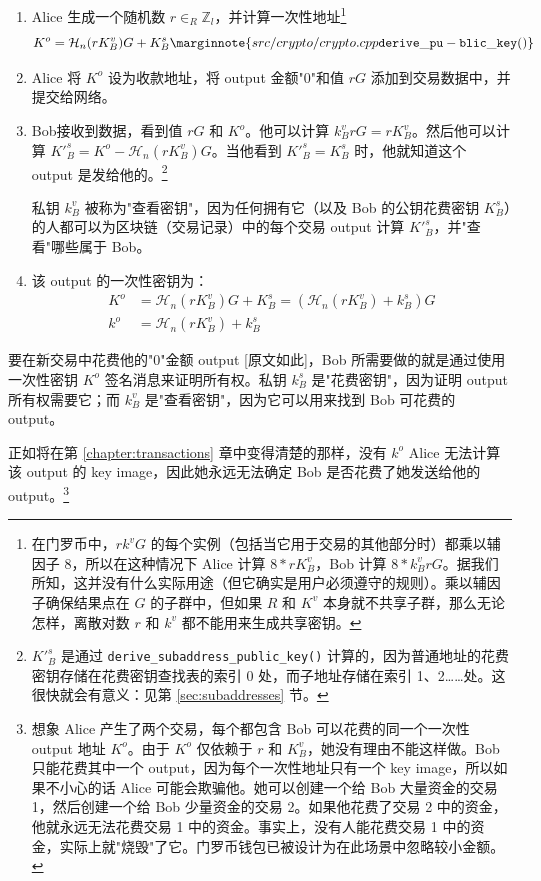 \begin{enumerate}
	\item Alice 生成一个随机数 $r \in_R \mathbb{Z}_l$，并计算一次性地址\footnote{在门罗币中，$r k^v G$ 的每个实例（包括当它用于交易的其他部分时）都乘以辅因子 8，所以在这种情况下 Alice 计算 $8*r K^v_B$，Bob 计算 $8*k^v_B r G$。据我们所知，这并没有什么实际用途（但它{确实}是用户必须遵守的规则）。乘以辅因子确保结果点在 $G$ 的子群中，但如果 $R$ 和 $K^v$ 本身就不共享子群，那么无论怎样，离散对数 $r$ 和 $k^v$ 都不能用来生成共享密钥。}\vspace{.175cm}
	\[K^o  = \mathcal{H}_n(r K_B^v)G + K_B^s\marginnote{src/crypto/ crypto.cpp {\tt derive\_pu- blic\_key()}}\]

	\item Alice 将 $K^o$ 设为收款地址，将 output 金额"0"和值 $r G$ 添加到交易数据中，并提交给网络。

	\item Bob接收到数据，看到值 $r G$ 和 $K^o$。他可以计算 $k_B^v r G = r K_B^v$。然后他可以计算 $K'^s_B = K^o - \mathcal{H}_n(r K_B^v)G$。当他看到 $K'^s_B = K_B^s$ 时，他就知道这个 output 是发给他的。\footnote{$K'^s_B $ 是通过 {\tt derive\_subaddress\_public\_key()} 计算的，因为普通地址的花费密钥存储在花费密钥查找表的索引 0 处，而子地址存储在索引 1、2……处。这很快就会有意义：见第 \ref{sec:subaddresses} 节。}

	私钥 $k_B^v$ 被称为"查看密钥"，因为任何拥有它（以及 Bob 的公钥花费密钥 $K_B^s$）的人都可以为区块链（交易记录）中的每个交易 output 计算 $K'^s_B$，并"查看"哪些属于 Bob。

	\item 该 output 的一次性密钥为：\vspace{.175cm}
	\begin{align*}
		K^o &= \mathcal{H}_n(r K_B^v)G + K_B^s = (\mathcal{H}_n(r K_B^v) + k_B^s)G  \\ 
		k^o &= \mathcal{H}_n(r K_B^v) + k_B^s
	\end{align*}
\end{enumerate}

要在新交易中花费他的"0"金额 output [原文如此]，Bob 所需要做的就是通过使用一次性密钥 $K^o$ 签名消息来证明所有权。私钥 $k_B^s$ 是"花费密钥"，因为证明 output 所有权需要它；而 $k_B^v$ 是"查看密钥"，因为它可以用来找到 Bob 可花费的 output。

正如将在第 \ref{chapter:transactions} 章中变得清楚的那样，没有 $k^o$ Alice 无法计算该 output 的 key image，因此她永远无法确定 Bob 是否花费了她发送给他的 output。\footnote{想象 Alice 产生了两个交易，每个都包含 Bob 可以花费的同一个一次性 output 地址 $K^o$。由于 $K^o$ 仅依赖于 $r$ 和 $K_B^v$，她没有理由不能这样做。Bob 只能花费其中一个 output，因为每个一次性地址只有一个 key image，所以如果不小心的话 Alice 可能会欺骗他。她可以创建一个给 Bob 大量资金的交易 1，然后创建一个给 Bob 少量资金的交易 2。如果他花费了交易 2 中的资金，他就永远无法花费交易 1 中的资金。事实上，没有人能花费交易 1 中的资金，实际上就"烧毁"了它。门罗币钱包已被设计为在此场景中忽略较小金额。}

